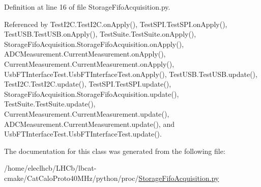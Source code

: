 Definition at line 16 of file Storage\+Fifo\+Acquisition.\+py.



Referenced by Test\+I2\+C.\+Test\+I2\+C.\+on\+Apply(), Test\+S\+P\+I.\+Test\+S\+P\+I.\+on\+Apply(), Test\+U\+S\+B.\+Test\+U\+S\+B.\+on\+Apply(), Test\+Suite.\+Test\+Suite.\+on\+Apply(), Storage\+Fifo\+Acquisition.\+Storage\+Fifo\+Acquisition.\+on\+Apply(), A\+D\+C\+Measurement.\+Current\+Measurement.\+on\+Apply(), Current\+Measurement.\+Current\+Measurement.\+on\+Apply(), Usb\+F\+T\+Interface\+Test.\+Usb\+F\+T\+Interface\+Test.\+on\+Apply(), Test\+U\+S\+B.\+Test\+U\+S\+B.\+update(), Test\+I2\+C.\+Test\+I2\+C.\+update(), Test\+S\+P\+I.\+Test\+S\+P\+I.\+update(), Storage\+Fifo\+Acquisition.\+Storage\+Fifo\+Acquisition.\+update(), Test\+Suite.\+Test\+Suite.\+update(), Current\+Measurement.\+Current\+Measurement.\+update(), A\+D\+C\+Measurement.\+Current\+Measurement.\+update(), and Usb\+F\+T\+Interface\+Test.\+Usb\+F\+T\+Interface\+Test.\+update().



The documentation for this class was generated from the following file\+:\begin{DoxyCompactItemize}
\item 
/home/eleclhcb/\+L\+H\+Cb/lbcat-\/cmake/\+Cat\+Calo\+Proto40\+M\+Hz/python/proc/\hyperlink{StorageFifoAcquisition_8py}{Storage\+Fifo\+Acquisition.\+py}\end{DoxyCompactItemize}

